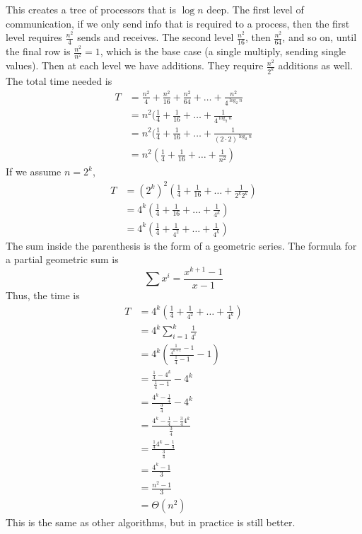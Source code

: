\documentclass[12pt]{article}
\numberwithin{equation}{section}
\theoremstyle{theorem}
\theoremstyle{definition}
\theoremstyle{remark}
\begin{document}
This creates a tree of processors that is $\log n$ deep.  The first level of communication, if we only send info that is required to a process, then the first level requires $\frac{n^2}{4}$ sends and receives.  The second level $\frac{n^2}{16}$, then $\frac{n^2}{64}$, and so on, until the final row is $\frac{n^2}{n^2} = 1$, which is the base case (a single multiply, sending single values).  Then at each level we have additions.  They require $\frac{n^2}{2^k}$ additions as well.  The total time needed is
\begin{align}
T &= \frac{n^2}{4} + \frac{n^2}{16} + \frac{n^2}{64} + \dots + \frac{n^2}{4^{\log_2 n}} \\
	&= n^2 (\frac{1}{4} + \frac{1}{16} + \dots + \frac{1}{4^{\log_2 n}} \\
	&= n^2 (\frac{1}{4} + \frac{1}{16} + \dots + \frac{1}{(2\cdot2)^{\log_2 n}} \\
	&= n^2 (\frac{1}{4} + \frac{1}{16} + \dots + \frac{1}{n^2})
\end{align}
If we assume $n = 2^k$,
\begin{align}
T &= (2^k)^2 (\frac{1}{4} + \frac{1}{16} + \dots + \frac{1}{2^k2^k}) \\
	&= 4^k (\frac{1}{4} + \frac{1}{16} + \dots + \frac{1}{4^k}) \\
	&= 4^k (\frac{1}{4} + \frac{1}{4^2} + \dots + \frac{1}{4^k}) 
\end{align}
The sum inside the parenthesis is the form of a geometric series.  The formula for a partial geometric sum is
\begin{equation}
\sum x^i = \frac{x^{k+1} - 1}{x - 1}
\end{equation}
Thus, the time is
\begin{align}
T 	&= 4^k (\frac{1}{4} + \frac{1}{4^2} + \dots + \frac{1}{4^k})  \\
	&= 4^k \sum_{i=1}^k \frac{1}{4^i} \\
	&= 4^k (\frac{\frac{1}{4^{k+1}} - 1}{\frac{1}{4}-1} - 1) \\
	&= \frac{\frac{1}{4} - 4^k}{\frac{1}{4}-1} - 4^k \\
	&= \frac{4^k - \frac{1}{4}}{\frac{3}{4}} - 4^k \\
	&= \frac{4^k - \frac{1}{4} - \frac{3}{4}4^k}{\frac{3}{4}} \\
	&= \frac{\frac{1}{4}4^k - \frac{1}{4}}{\frac{3}{4}} \\
	&= \frac{4^k - 1}{3} \\
	&= \frac{n^2 - 1}{3} \\
	&= \Theta(n^2)
\end{align}
This is the same as other algorithms, but in practice is still better. 
\end{document}
